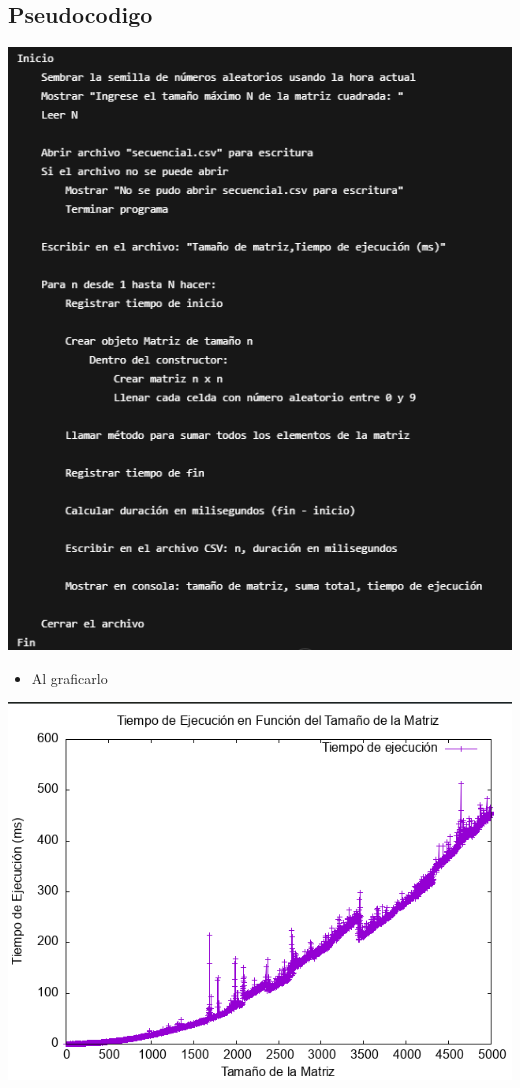 \documentclass{article}
\begin{document}
	\subsection{Pseudocodigo}
        \includegraphics[width=1\textwidth]{img/pseudocodigo_1.png}        
	\begin{itemize}	
		\item Al graficarlo
	\end{itemize}
        \includegraphics[width=1\textwidth]{img/grafica_1.png}
\end{document}
